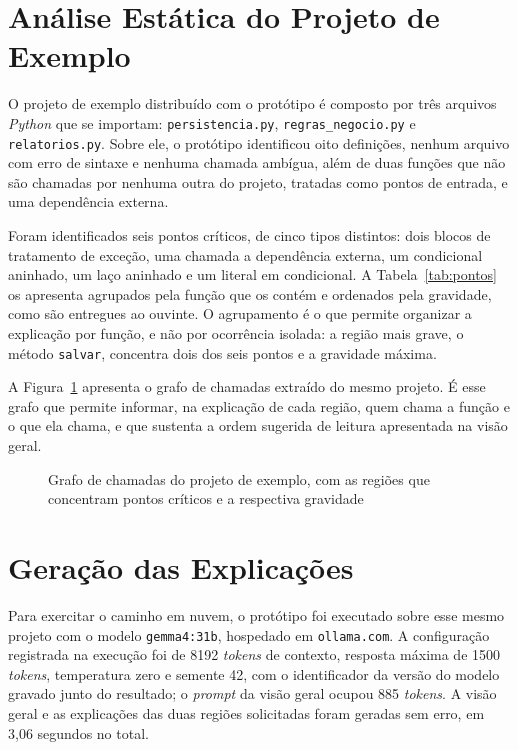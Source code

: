 \documentclass[
    12pt,                   %
    openright,              %
    oneside,                %
    a4paper,                %
    sumario=tradicional,    %
    english,                %
    brazil,                 %
    ]{abntex2}
\begin{document}
\section{Análise Estática do Projeto de Exemplo}\label{sec:resultanalise}

O projeto de exemplo distribuído com o protótipo é composto por três arquivos \textit{Python} que se importam: \texttt{persistencia.py}, \texttt{regras\_negocio.py} e \texttt{relatorios.py}. Sobre ele, o protótipo identificou oito definições, nenhum arquivo com erro de sintaxe e nenhuma chamada ambígua, além de duas funções que não são chamadas por nenhuma outra do projeto, tratadas como pontos de entrada, e uma dependência externa.

Foram identificados seis pontos críticos, de cinco tipos distintos: dois blocos de tratamento de exceção, uma chamada a dependência externa, um condicional aninhado, um laço aninhado e um literal em condicional. A Tabela~\ref{tab:pontos} os apresenta agrupados pela função que os contém e ordenados pela gravidade, como são entregues ao ouvinte. O agrupamento é o que permite organizar a explicação por função, e não por ocorrência isolada: a região mais grave, o método \texttt{salvar}, concentra dois dos seis pontos e a gravidade máxima.



A Figura~\ref{fig:mapa} apresenta o grafo de chamadas extraído do mesmo projeto. É esse grafo que permite informar, na explicação de cada região, quem chama a função e o que ela chama, e que sustenta a ordem sugerida de leitura apresentada na visão geral.

\begin{figure}[htbp]
  \centering
  
  \caption{Grafo de chamadas do projeto de exemplo, com as regiões que concentram pontos críticos e a respectiva gravidade}
  \label{fig:mapa}
\end{figure}

\section{Geração das Explicações}\label{sec:resultgeracao}

Para exercitar o caminho em nuvem, o protótipo foi executado sobre esse mesmo projeto com o modelo \texttt{gemma4:31b}, hospedado em \texttt{ollama.com}. A configuração registrada na execução foi de 8192 \textit{tokens} de contexto, resposta máxima de 1500 \textit{tokens}, temperatura zero e semente 42, com o identificador da versão do modelo gravado junto do resultado; o \textit{prompt} da visão geral ocupou 885 \textit{tokens}. A visão geral e as explicações das duas regiões solicitadas foram geradas sem erro, em 3,06 segundos no total.
\end{document}
